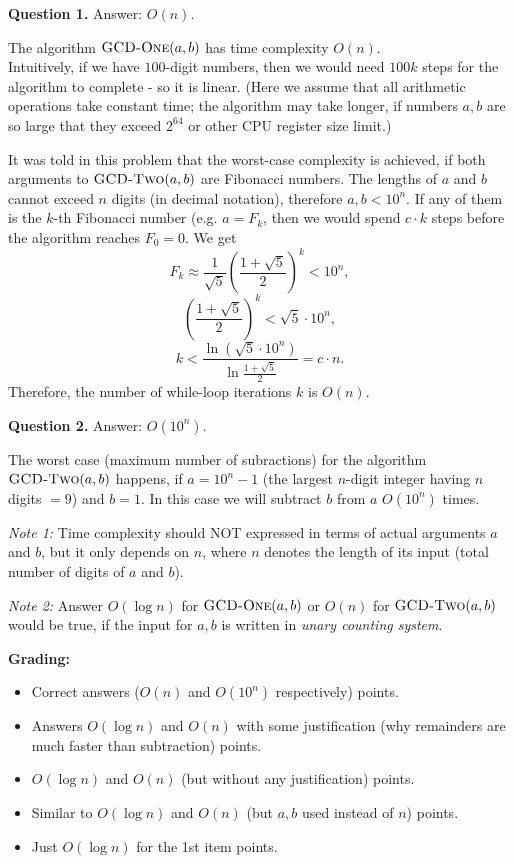 \documentclass[a4paper,12pt]{article}
\begin{document}
\vspace{10pt} 
{\bf Question 1.} Answer: $O(n)$.

The algorithm $\text{\textsc{GCD-One}}(a,b)$ has time complexity $O(n)$.\\
Intuitively, if we have $100$-digit numbers, then we would need $100k$ steps for the algorithm to 
complete - so it is linear. 
(Here we assume that all arithmetic operations take constant time; the algorithm may take longer, if numbers
$a,b$ are so large that they exceed $2^{64}$ or other CPU register size limit.)

It was told in this problem that the worst-case complexity is achieved, if both 
arguments to $\text{\textsc{GCD-Two}}(a,b)$ are Fibonacci numbers. The lengths of $a$ and $b$ 
cannot exceed $n$ digits (in decimal notation), therefore $a,b < 10^n$. 
If any of them is the $k$-th Fibonacci number (e.g. $a = F_k$, then we would spend $c \cdot k$ steps
before the algorithm reaches $F_0 = 0$. We get 
$$F_k \approx \frac{1}{\sqrt{5}}\left(\frac{1+\sqrt{5}}{2} \right)^k < 10^n,$$
$$\left(\frac{1+\sqrt{5}}{2} \right)^k < \sqrt{5} \cdot 10^n,$$
$$k < \frac{\ln (\sqrt{5} \cdot 10^n)}{\ln \frac{1+\sqrt{5}}{2}} = c \cdot n.$$
Therefore, the number of while-loop iterations $k$ is $O(n)$.


\vspace{20pt} 
{\bf Question 2.} Answer: $O(10^n)$.

The worst case (maximum number of subractions) for 
the algorithm $\text{\textsc{GCD-Two}}(a,b)$  happens, if $a = 10^n-1$ 
(the largest $n$-digit integer having $n$ digits $=9$) and $b = 1$. In this case we will subtract $b$ from $a$ 
$O(10^n)$ times.


{\em Note 1:} Time complexity should NOT expressed in 
terms of actual arguments $a$ and $b$, but it only depends on $n$, 
where $n$ denotes the length of its input (total number of digits of $a$ and $b$).

{\em Note 2:} Answer $O(\log n)$ for $\text{\textsc{GCD-One}}(a,b)$ or
$O(n)$ for $\text{\textsc{GCD-Two}}(a,b)$ would be true, if the input for $a,b$ 
is written in {\em unary counting system}. 

\vspace{20pt}
{\bf Grading:} 
\begin{itemize} 
\item Correct answers ($O(n)$ and $O(10^n)$ respectively)  points.
\item Answers $O(\log n)$ and $O(n)$ with some justification (why remainders are 
much faster than subtraction)  points. 
\item $O(\log n)$ and $O(n)$ (but without any justification)  points. 
\item Similar to $O(\log n)$ and $O(n)$ (but $a,b$ used instead of $n$)  points. 
\item Just $O(\log n)$ for the 1st item  points. 
\end{itemize}
\end{document}
